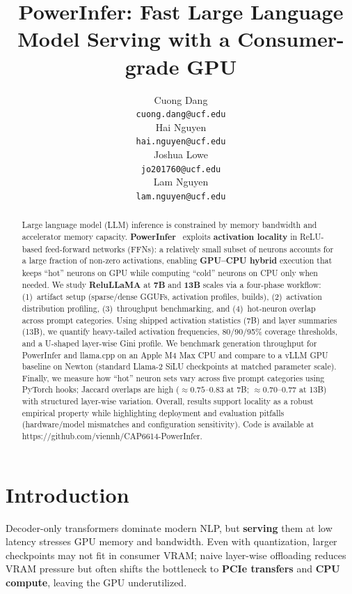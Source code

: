 \documentclass{article}
\title{PowerInfer: Fast Large Language Model Serving with a Consumer-grade GPU}
\author{%
  Cuong Dang\\  
  \texttt{cuong.dang@ucf.edu} \\
  \And
  Hai Nguyen \\  
  \texttt{hai.nguyen@ucf.edu} \\
  \And
  Joshua Lowe \\  
  \texttt{jo201760@ucf.edu} \\
  \And
  Lam Nguyen \\  
  \texttt{lam.nguyen@ucf.edu} \\
}
\begin{document}
\maketitle


\begin{abstract}
Large language model (LLM) inference is constrained by memory bandwidth and accelerator memory capacity.
\textbf{PowerInfer}~\cite{song2024powerinferfastlargelanguage} exploits \textbf{activation locality} in ReLU-based feed-forward networks (FFNs): a relatively small subset of neurons accounts for a large fraction of non-zero activations, enabling \textbf{GPU--CPU hybrid} execution that keeps ``hot'' neurons on GPU while computing ``cold'' neurons on CPU only when needed.
We study \textbf{ReluLLaMA} at \textbf{7B} and \textbf{13B} scales via a four-phase workflow: (1)~artifact setup (sparse/dense GGUFs, activation profiles, builds), (2)~activation distribution profiling, (3)~throughput benchmarking, and (4)~hot-neuron overlap across prompt categories.
Using shipped activation statistics (7B) and layer summaries (13B), we quantify heavy-tailed activation frequencies, 80/90/95\% coverage thresholds, and a U-shaped layer-wise Gini profile.
We benchmark generation throughput for PowerInfer and llama.cpp on an Apple M4 Max CPU and compare to a vLLM GPU baseline on Newton (standard Llama-2 SiLU checkpoints at matched parameter scale).
Finally, we measure how ``hot'' neuron sets vary across five prompt categories using PyTorch hooks; Jaccard overlaps are high ($\approx\!0.75$--$0.83$ at 7B; $\approx\!0.70$--$0.77$ at 13B) with structured layer-wise variation.
Overall, results support locality as a robust empirical property while highlighting deployment and evaluation pitfalls (hardware/model mismatches and configuration sensitivity). Code is available at https://github.com/viennh/CAP6614-PowerInfer.

\end{abstract}



\section{Introduction}
Decoder-only transformers dominate modern NLP, but \textbf{serving} them at low latency stresses GPU memory and bandwidth.
Even with quantization, larger checkpoints may not fit in consumer VRAM; naive layer-wise offloading reduces VRAM pressure but often shifts the bottleneck to \textbf{PCIe transfers} and \textbf{CPU compute}, leaving the GPU underutilized.
\end{document}
